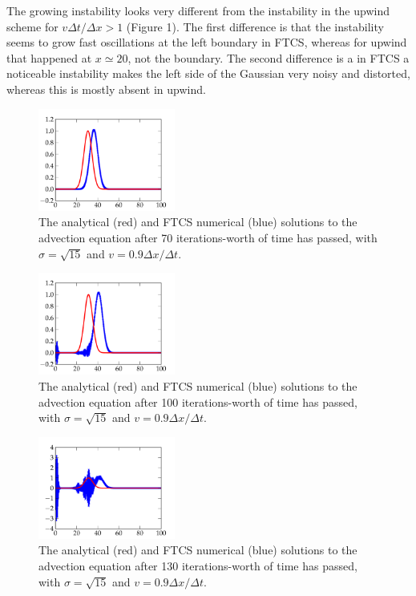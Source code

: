 \documentclass{article}
\begin{document}
\begin{spacing}{1.1}
The growing instability looks very different from the instability in the upwind scheme for \(v \Delta t / \Delta x > 1\) (Figure 1). The first difference is that the instability seems to grow fast oscillations at the left boundary in FTCS, whereas for upwind that happened at \(x\simeq20\), not the boundary. The second difference is a in FTCS a noticeable instability makes the left side of the Gaussian very noisy and distorted, whereas this is mostly absent in upwind.
\begin{figure}[H]
 \centering
 \hspace{0cm} \includegraphics[width=0.4\textwidth]{fig-ftcs0.pdf}
 \caption{The analytical (red) and FTCS numerical (blue) solutions to the advection equation after 70 iterations-worth of time has passed, with \(\sigma = \sqrt{15}\) and \(v = 0.9 \Delta x / \Delta t\).}
 \label{fig-ftcs0}
\end{figure} 

\begin{figure}[H]
 \centering
 \hspace{0cm} \includegraphics[width=0.4\textwidth]{fig-ftcs1.pdf}
 \caption{The analytical (red) and FTCS numerical (blue) solutions to the advection equation after 100 iterations-worth of time has passed, with \(\sigma = \sqrt{15}\) and \(v = 0.9 \Delta x / \Delta t\).}
 \label{fig-ftcs1}
\end{figure} 

\begin{figure}[H]
 \centering
 \hspace{0cm} \includegraphics[width=0.4\textwidth]{fig-ftcs2.pdf}
 \caption{The analytical (red) and FTCS numerical (blue) solutions to the advection equation after 130 iterations-worth of time has passed, with \(\sigma = \sqrt{15}\) and \(v = 0.9 \Delta x / \Delta t\).}
 \label{fig-ftcs2}
\end{figure} 


\end{spacing}
\end{document}
